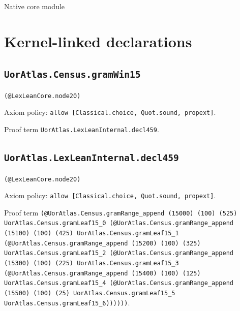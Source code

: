 \documentclass[11pt]{article}
\begin{document}
\begin{center}{\LARGE Native core module}\end{center}
\section*{Kernel-linked declarations}
\subsection*{\texttt{UorAtlas.Census.gramWin15}}
\noindent\texttt{(@LexLeanCore.node20)}\par
\noindent Axiom policy: \texttt{allow [Classical.choice, Quot.sound, propext]}.\par
\noindent Proof term \texttt{UorAtlas.LexLeanInternal.decl459}.\par
\subsection*{\texttt{UorAtlas.LexLeanInternal.decl459}}
\noindent\texttt{(@LexLeanCore.node20)}\par
\noindent Axiom policy: \texttt{allow [Classical.choice, Quot.sound, propext]}.\par
\noindent Proof term \texttt{(@UorAtlas.Census.gramRange\_append (15000) (100) (525) UorAtlas.Census.gramLeaf15\_0 (@UorAtlas.Census.gramRange\_append (15100) (100) (425) UorAtlas.Census.gramLeaf15\_1 (@UorAtlas.Census.gramRange\_append (15200) (100) (325) UorAtlas.Census.gramLeaf15\_2 (@UorAtlas.Census.gramRange\_append (15300) (100) (225) UorAtlas.Census.gramLeaf15\_3 (@UorAtlas.Census.gramRange\_append (15400) (100) (125) UorAtlas.Census.gramLeaf15\_4 (@UorAtlas.Census.gramRange\_append (15500) (100) (25) UorAtlas.Census.gramLeaf15\_5 UorAtlas.Census.gramLeaf15\_6))))))}.\par
\end{document}
